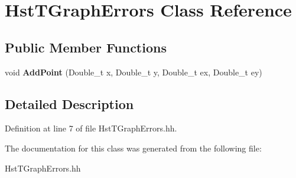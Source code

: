 \section{HstTGraphErrors Class Reference}
\label{classHstTGraphErrors}
\subsection*{Public Member Functions}
\begin{DoxyCompactItemize}
\item 
void {\bfseries AddPoint} (Double\_\-t x, Double\_\-t y, Double\_\-t ex, Double\_\-t ey)\label{classHstTGraphErrors_ae5c0b07b9beab247ae528aa467c98530}

\end{DoxyCompactItemize}


\subsection{Detailed Description}


Definition at line 7 of file HstTGraphErrors.hh.

The documentation for this class was generated from the following file:\begin{DoxyCompactItemize}
\item 
HstTGraphErrors.hh\end{DoxyCompactItemize}
